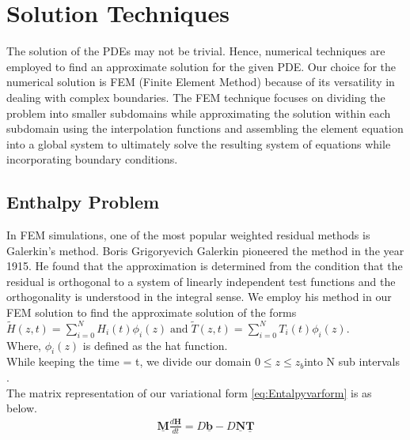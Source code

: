 \chapter{Solution Techniques\label{cha:chapter3}}
The solution of the PDEs may not be trivial. Hence, numerical techniques are employed to find an approximate solution for the given PDE. Our choice for the numerical solution is FEM (Finite Element Method) because of its versatility in dealing with complex boundaries.
The FEM technique focuses on dividing the problem into smaller subdomains while approximating the solution within each subdomain using the interpolation functions and assembling the element equation into a global system to ultimately solve the resulting system of equations while incorporating boundary conditions. 

\section{Enthalpy Problem\label{sec:reqoverview}}

In FEM simulations, one of the most popular weighted residual methods is Galerkin's method\cite{galerkin1915series}. Boris Grigoryevich Galerkin pioneered the method in the year 1915\cite{galerkin1915series}. He found that the approximation is determined from the condition that the residual is orthogonal to a system of linearly independent test functions and the orthogonality is understood in the integral sense\cite{Repin+2017+351+357}. We employ his method in our FEM solution to find the approximate solution of the forms $\tilde{H}(z,t) = \sum_{i=0}^NH_i(t)\phi_i(z) \; \text{and}\; \tilde{T}(z,t) = \sum_{i=0}^NT_i(t)\phi_i(z)$.\\  Where, $\phi_i(z)$ is defined as the hat function.\\
While keeping the time = t, we divide our domain $0 \leq z \leq z_b$into N sub intervals \cite{verhoeven2003modelling}.\\The matrix representation of our  variational form \eqref{eq:Entalpyvarform}  is as below\cite{verhoeven2003modelling}.
\begin{subequations}
\begin{align}
    \underline{\mathbf{M}}\frac{d\underline{\mathbf{H}}}{dt} = D\underline{\mathbf{b}}-D\underline{\mathbf{N}}\underline{\mathbf{T}} \label{eq:discretEnthlp}
\end{align}
\end{subequations}

